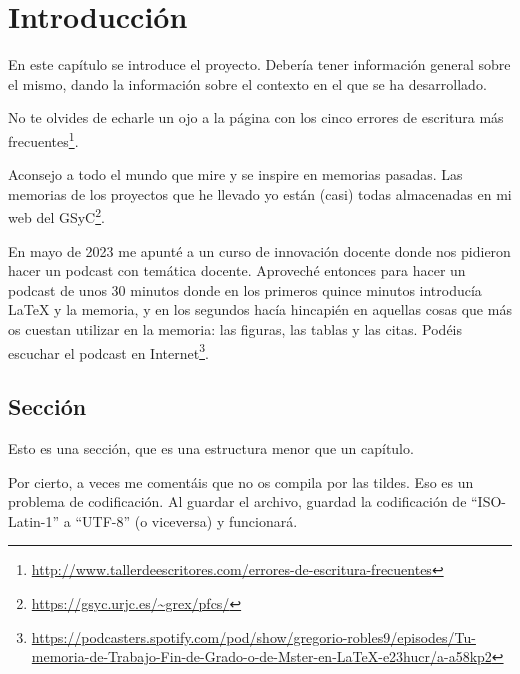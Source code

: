 \documentclass[a4paper, 12pt]{book}
\begin{document}
	
	
	\cleardoublepage
	\chapter{Introducción}
	\label{sec:intro} %
	
	En este capítulo se introduce el proyecto.
	Debería tener información general sobre el mismo, dando la información sobre el contexto en el que se ha desarrollado.
	
	No te olvides de echarle un ojo a la página con los cinco errores de escritura más frecuentes\footnote{\url{http://www.tallerdeescritores.com/errores-de-escritura-frecuentes}}.
	
	Aconsejo a todo el mundo que mire y se inspire en memorias pasadas.
	Las memorias de los proyectos que he llevado yo están (casi) todas almacenadas en mi web del GSyC\footnote{\url{https://gsyc.urjc.es/~grex/pfcs/}}.
	
	En mayo de 2023 me apunté a un curso de innovación docente donde nos pidieron hacer un podcast con temática docente. Aproveché entonces para hacer un podcast de unos 30 minutos donde en los primeros quince minutos introducía LaTeX y la memoria, y en los segundos hacía hincapién en aquellas cosas que más os cuestan utilizar en la memoria: las figuras, las tablas y las citas. Podéis escuchar el podcast en Internet\footnote{\url{https://podcasters.spotify.com/pod/show/gregorio-robles9/episodes/Tu-memoria-de-Trabajo-Fin-de-Grado-o-de-Mster-en-LaTeX-e23hucr/a-a58kp2}}.
	
	
	\section{Sección}
	\label{sec:seccion}
	
	Esto es una sección, que es una estructura menor que un capítulo. 
	
	Por cierto, a veces me comentáis que no os compila por las tildes.
	Eso es un problema de codificación.
	Al guardar el archivo, guardad la codificación de ``ISO-Latin-1'' a ``UTF-8'' (o viceversa) y funcionará.
	
\end{document}
